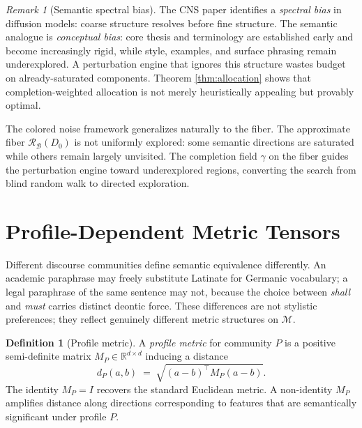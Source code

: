 \documentclass[12pt, a4paper]{article}
\theoremstyle{plain}
\theoremstyle{definition}
\newtheorem{definition}[theorem]{Definition}
\theoremstyle{remark}
\newtheorem{remark}[theorem]{Remark}
\newcommand{\calM}{\mathcal{M}}
\newcommand{\calR}{\mathcal{R}}
\newcommand{\bR}{\mathbb{R}}
\begin{document}
\begin{remark}[Semantic spectral bias]
The CNS paper \cite{davidson2026colorednoisediffusionsampling} identifies a
\emph{spectral bias} in diffusion models: coarse structure resolves before fine
structure.  The semantic analogue is \emph{conceptual bias}: core thesis and
terminology are established early and become increasingly rigid, while style,
examples, and surface phrasing remain underexplored.  A perturbation engine that
ignores this structure wastes budget on already-saturated components.  Theorem
\ref{thm:allocation} shows that completion-weighted allocation is not merely
heuristically appealing but provably optimal.
\end{remark}

The colored noise framework generalizes naturally to the fiber.  The approximate
fiber $\calR_\mathcal{B}(D_0)$ is not uniformly explored: some semantic
directions are saturated while others remain largely unvisited.  The completion
field $\gamma$ on the fiber guides the perturbation engine toward underexplored
regions, converting the search from blind random walk to directed exploration.


\section{Profile-Dependent Metric Tensors}
\label{sec:profiles}

Different discourse communities define semantic equivalence differently.  An
academic paraphrase may freely substitute Latinate for Germanic vocabulary; a
legal paraphrase of the same sentence may not, because the choice between
\emph{shall} and \emph{must} carries distinct deontic force.  These differences
are not stylistic preferences; they reflect genuinely different metric structures
on $\calM$.

\begin{definition}[Profile metric]
\label{def:profile_metric}
A \emph{profile metric} for community $P$ is a positive semi-definite matrix
$M_P \in \bR^{d \times d}$ inducing a distance
\[
   d_P(a, b) \;=\; \sqrt{(a - b)^\top M_P (a - b)}.
\]
The identity $M_P = I$ recovers the standard Euclidean metric.  A
non-identity $M_P$ amplifies distance along directions corresponding to
features that are semantically significant under profile $P$.
\end{definition}
\end{document}
